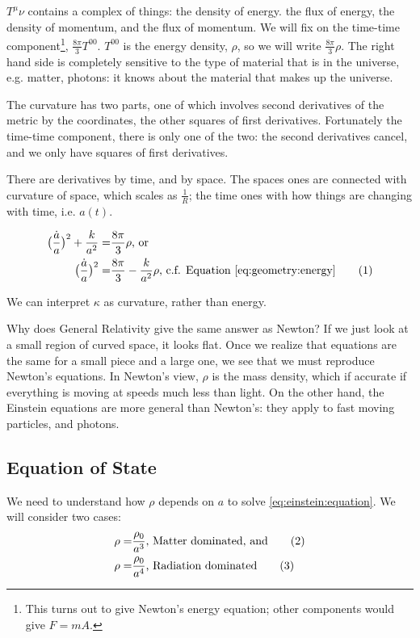 \documentclass[]{article}
\newcommand\numberthis{\addtocounter{equation}{1}\tag{\theequation}}
\begin{document}
$T^\mu\nu$ contains a complex of things: the density of energy. the flux of energy, the density of momentum, and the flux of momentum. We will fix on the time-time component\footnote{This turns out to give Newton's energy equation; other components would give $F=mA$.}, $\frac{8\pi}{3} T^{00}$. $T^{00}$ is the energy density, $\rho$, so we will write $\frac{8\pi}{3} \rho$. The right hand side is completely sensitive to the type of material that is in the universe, e.g. matter, photons: it knows about the material that makes up the universe.

The curvature has two parts, one of which involves second derivatives of the metric by the coordinates, the other squares of first derivatives. Fortunately the time-time component, there is only one of the two: the second derivatives cancel, and we only have squares of first derivatives.

There are derivatives by time, and by space. The spaces ones are connected with curvature of space, which scales as $\frac{1}{R}$; the time ones with how things are changing with time, i.e. $a(t)$.

\begin{align*}
	\big(\frac{\dot{a}}{a}\big)^2 + \frac{k}{a^2}=& \frac{8\pi}{3} \rho \text{, or}\\
	\big(\frac{\dot{a}}{a}\big)^2 =& \frac{8\pi}{3} - \frac{k}{a^2}\rho \text{, c.f. Equation \eqref{eq:geometry:energy}} \numberthis \label{eq:einstein:equation}
\end{align*}

We can interpret $\kappa$ as curvature, rather than energy.

Why does General Relativity give the same answer as Newton? If we just look at a small region of curved space, it looks flat. Once we realize that equations are the same for a small piece and a large one, we see that we must reproduce Newton's equations. In Newton's view, $\rho$ is the mass density, which if accurate if everything is moving at speeds much less than light. On the other hand, the Einstein equations are more general than Newton's: they apply to fast moving particles, and photons.

\subsection{Equation of State}\label{sec:equation:state}

We need to understand how $\rho$ depends on $a$ to solve \eqref{eq:einstein:equation}. We will consider two cases:
\begin{align*}
	\rho=&\frac{\rho_0}{a^3} \text{, Matter dominated, and} \numberthis \label{eq:matter:eos}\\
	\rho=&\frac{\rho_0}{a^4} \text{,  Radiation dominated} \numberthis \label{eq:radiation:eos}
\end{align*}
\end{document}
